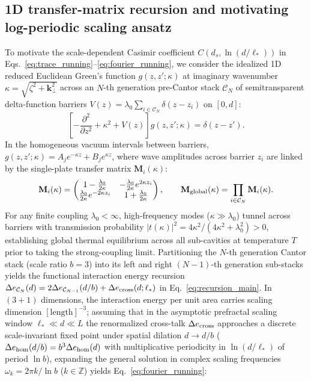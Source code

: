 \documentclass[pdflatex,sn-nature]{sn-jnl}
\begin{document}
\subsection*{1D transfer-matrix recursion and motivating log-periodic scaling ansatz}
To motivate the scale-dependent Casimir coefficient $C(d_s, \ln(d/\ell_*))$ in Eqs.~\eqref{eq:trace_running}--\eqref{eq:fourier_running}\cite{gordon2026prd}, we consider the idealized 1D reduced Euclidean Green's function $g(z, z'; \kappa)$ at imaginary wavenumber $\kappa = \sqrt{\zeta^2 + \mathbf{k}_\perp^2}$ across an $N$-th generation pre-Cantor stack $\mathcal{C}_N$ of semitransparent delta-function barriers $V(z) = \lambda_0 \sum_{i \in \mathcal{C}_N} \delta(z - z_i)$ on $[0, d]$:
\begin{equation}
\left[ -\frac{\partial^2}{\partial z^2} + \kappa^2 + V(z) \right] g(z, z'; \kappa) = \delta(z - z').
\end{equation}
In the homogeneous vacuum intervals between barriers, $g(z, z'; \kappa) = A_j e^{-\kappa z} + B_j e^{\kappa z}$, where wave amplitudes across barrier $z_i$ are linked by the single-plate transfer matrix $\mathbf{M}_i(\kappa)$:
\begin{equation}
\mathbf{M}_i(\kappa) = \begin{pmatrix} 1 - \frac{\lambda_0}{2\kappa} & -\frac{\lambda_0}{2\kappa} e^{2\kappa z_i} \\ \frac{\lambda_0}{2\kappa} e^{-2\kappa z_i} & 1 + \frac{\lambda_0}{2\kappa} \end{pmatrix}, \qquad \mathbf{M}_{\rm global}(\kappa) = \prod_{i \in \mathcal{C}_N} \mathbf{M}_i(\kappa).
\end{equation}
For any finite coupling $\lambda_0 < \infty$, high-frequency modes ($\kappa \gg \lambda_0$) tunnel across barriers with transmission probability $|t(\kappa)|^2 = 4\kappa^2 / (4\kappa^{2} + \lambda_0^2) > 0$, establishing global thermal equilibrium across all sub-cavities at temperature $T$ prior to taking the strong-coupling limit\cite{gordon2026prd}. Partitioning the $N$-th generation Cantor stack (scale ratio $b=3$) into its left and right $(N-1)$-th generation sub-stacks yields the functional interaction energy recursion $\Delta e_{\mathcal{C}_N}(d) = 2\Delta e_{\mathcal{C}_{N-1}}(d/b) + \Delta e_{\rm cross}(d; \ell_*)$ in Eq.~\eqref{eq:recursion_main}. In $(3+1)$ dimensions, the interaction energy per unit area carries scaling dimension $[\text{length}]^{-3}$; assuming that in the asymptotic prefractal scaling window $\ell_* \ll d \ll L$ the renormalized cross-talk $\Delta e_{\rm cross}$ approaches a discrete scale-invariant fixed point under spatial dilation $d \to d/b$ ($\Delta e_{\rm hom}(d/b) = b^3 \Delta e_{\rm hom}(d)$ with multiplicative periodicity in $\ln(d/\ell_*)$ of period $\ln b$), expanding the general solution in complex scaling frequencies $\omega_k = 2\pi k / \ln b$ ($k \in \mathbb{Z}$) yields Eq.~\eqref{eq:fourier_running}:
\end{document}
